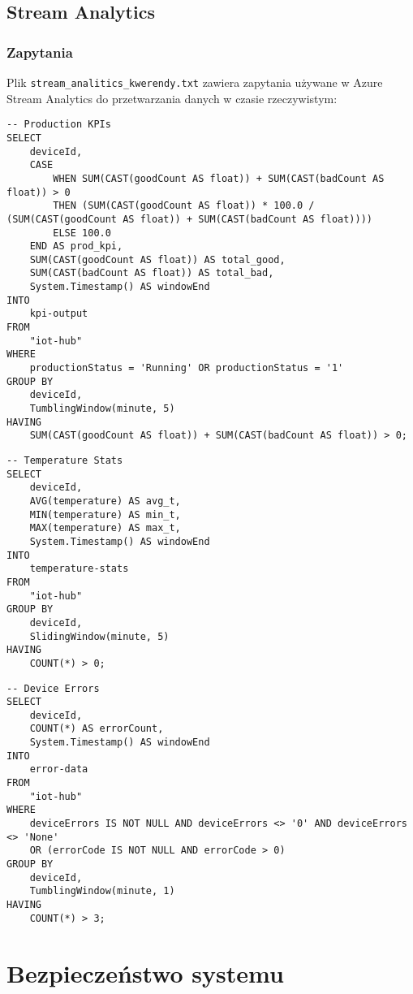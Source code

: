 \documentclass{article}
\begin{document}
\subsection{Stream Analytics}
\subsubsection{Zapytania}
Plik \texttt{stream\_analitics\_kwerendy.txt} zawiera zapytania używane w Azure Stream Analytics do przetwarzania danych w czasie rzeczywistym:

\begin{lstlisting}[caption=Zapytanie obliczające KPI produkcji]
-- Production KPIs
SELECT
    deviceId,
    CASE
        WHEN SUM(CAST(goodCount AS float)) + SUM(CAST(badCount AS float)) > 0
        THEN (SUM(CAST(goodCount AS float)) * 100.0 / (SUM(CAST(goodCount AS float)) + SUM(CAST(badCount AS float))))
        ELSE 100.0
    END AS prod_kpi,
    SUM(CAST(goodCount AS float)) AS total_good,
    SUM(CAST(badCount AS float)) AS total_bad,
    System.Timestamp() AS windowEnd
INTO
    kpi-output
FROM
    "iot-hub"
WHERE
    productionStatus = 'Running' OR productionStatus = '1'
GROUP BY
    deviceId,
    TumblingWindow(minute, 5)
HAVING
    SUM(CAST(goodCount AS float)) + SUM(CAST(badCount AS float)) > 0;
\end{lstlisting}

\begin{lstlisting}[caption=Zapytanie monitorujące statystyki temperatury]
-- Temperature Stats
SELECT
    deviceId,
    AVG(temperature) AS avg_t,
    MIN(temperature) AS min_t,
    MAX(temperature) AS max_t,
    System.Timestamp() AS windowEnd
INTO
    temperature-stats
FROM
    "iot-hub"
GROUP BY
    deviceId,
    SlidingWindow(minute, 5)
HAVING
    COUNT(*) > 0;
\end{lstlisting}

\begin{lstlisting}[caption=Zapytanie wykrywające błędy urządzeń]
-- Device Errors
SELECT
    deviceId,
    COUNT(*) AS errorCount,
    System.Timestamp() AS windowEnd
INTO
    error-data
FROM
    "iot-hub"
WHERE
    deviceErrors IS NOT NULL AND deviceErrors <> '0' AND deviceErrors <> 'None'
    OR (errorCode IS NOT NULL AND errorCode > 0)
GROUP BY
    deviceId,
    TumblingWindow(minute, 1)
HAVING
    COUNT(*) > 3;
\end{lstlisting}

\section{Bezpieczeństwo systemu}
\end{document}
